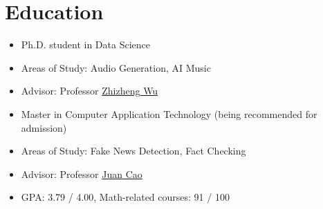 \documentclass{resume}
\begin{document}




\section{Education}
{
  \small
  \begin{itemize}
    \item Ph.D. student in Data Science
    \item Areas of Study: Audio Generation, AI Music
    \item Advisor: Professor
          \href{https://scholar.google.com/citations?user=K6zhweAAAAAJ&hl=en}{Zhizheng
            Wu}
  \end{itemize}
}

{
  \small
  \begin{itemize}
    \item Master in Computer Application Technology (being recommended for admission)
    \item Areas of Study: Fake News Detection, Fact Checking
    \item Advisor: Professor
          \href{https://scholar.google.com/citations?user=fSBdNg0AAAAJ&hl=zh-CN}{Juan
            Cao}
    \item GPA: 3.79 / 4.00, Math-related courses: 91 / 100
  \end{itemize}
}
\end{document}
